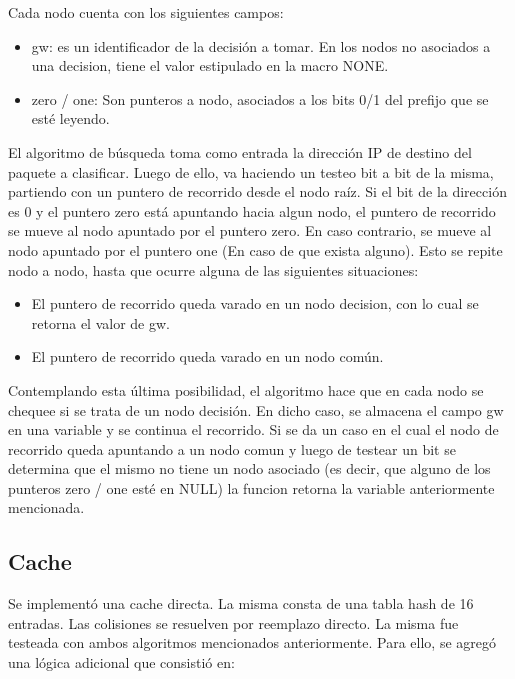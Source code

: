 Cada nodo cuenta con los siguientes campos:
\begin{itemize}
	\item gw: es un identificador de la decisión a tomar. En los nodos no asociados a una decision, tiene el valor estipulado en la macro NONE.
    \item zero / one: Son punteros a nodo, asociados a los bits 0/1 del prefijo que se esté leyendo.

\end{itemize}




El algoritmo de búsqueda toma como entrada la dirección IP de destino del paquete a clasificar. Luego de ello, va haciendo un testeo bit a bit de la misma, partiendo con un puntero de recorrido desde el nodo raíz. Si el bit de la dirección es 0 y el puntero zero está apuntando hacia algun nodo, el puntero de recorrido se mueve al nodo apuntado por el puntero zero. En caso contrario, se mueve al nodo apuntado por el puntero one (En caso de que exista alguno). Esto se repite nodo a nodo, hasta que ocurre alguna de las siguientes situaciones:

\begin{itemize}
    	\item     El puntero de recorrido queda varado en un nodo decision, con lo cual se retorna el valor de gw.
    	\item El puntero de recorrido queda varado en un nodo común. 
\end{itemize}



Contemplando esta última posibilidad, el algoritmo hace que en cada nodo se chequee si se trata de un nodo decisión. En dicho caso, se almacena el campo gw en una variable y se continua el recorrido. Si se da un caso en el cual el nodo de recorrido queda apuntando a un nodo comun y luego de testear un bit se determina que el mismo no tiene un nodo asociado (es decir, que alguno de los punteros zero / one esté en NULL) la funcion retorna la variable anteriormente mencionada. 

\subsection {Cache}

Se implementó una cache directa. La misma consta de una tabla hash de 16 entradas. Las colisiones se resuelven por reemplazo directo. La misma fue testeada con ambos algoritmos mencionados anteriormente. Para ello, se agregó una lógica adicional que consistió en:

